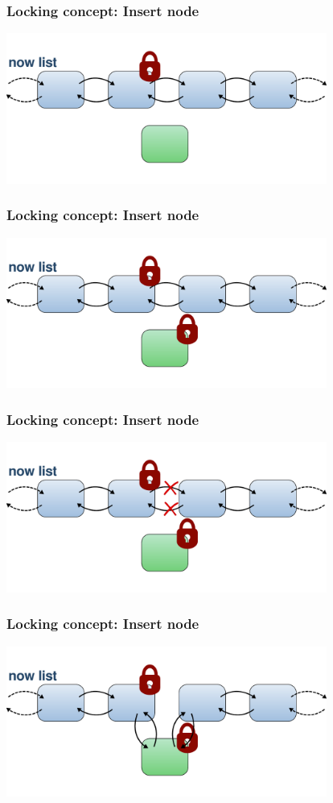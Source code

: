 \documentclass{beamer}
\begin{document}
\begin{frame}
\frametitle{Locking concept: Insert node}
\begin{center}
	\includegraphics[height=140pt]{insert2.pdf}
\end{center}
\end{frame}

\begin{frame}
\frametitle{Locking concept: Insert node}
\begin{center}
	\includegraphics[height=140pt]{insert2b.pdf}
\end{center}
\end{frame}

\begin{frame}
\frametitle{Locking concept: Insert node}
\begin{center}
	\includegraphics[height=140pt]{insert3.pdf}
\end{center}
\end{frame}

\begin{frame}
\frametitle{Locking concept: Insert node}
\begin{center}
	\includegraphics[height=140pt]{insert4.pdf}
\end{center}
\end{frame}
\end{document}
